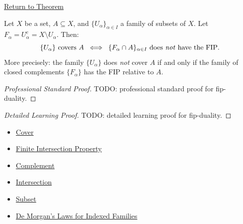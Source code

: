 \newpage
{}
\label{prf:fip-duality}

\begin{remark*}[Return]
\hyperref[prop:fip-duality]{Return to Theorem}
\end{remark*}

\begin{proposition*}
Let $X$ be a set, $A \subseteq X$, and $\{U_\alpha\}_{\alpha \in I}$ a
family of subsets of $X$. Let $F_\alpha = U_\alpha^c = X \setminus U_\alpha$.
Then:
\[
\{U_\alpha\} \text{ covers } A
\;\;\Longleftrightarrow\;\;
\{F_\alpha \cap A\}_{\alpha \in I} \text{ does \emph{not} have the FIP}.
\]
More precisely: the family $\{U_\alpha\}$ does \emph{not} cover $A$ if and
only if the family of closed complements $\{F_\alpha\}$ has the FIP relative
to $A$.
\end{proposition*}

\begin{proof}[Professional Standard Proof]
\LRAProofBodyStart
TODO: professional standard proof for fip-duality.
\end{proof}

\begin{proof}[Detailed Learning Proof]
\LRAProofBodyStart
TODO: detailed learning proof for fip-duality.
\end{proof}

\begin{remark*}
\end{remark*}

\begin{dependencies}
\begin{itemize}
  \item \hyperref[def:cover-full]{Cover}
  \item \hyperref[def:fip]{Finite Intersection Property}
  \item \hyperref[def:complement]{Complement}
  \item \hyperref[def:intersection]{Intersection}
  \item \hyperref[def:subset]{Subset}
  \item \hyperref[thm:indexed-de-morgan]{De Morgan's Laws for Indexed Families}
\end{itemize}
\end{dependencies}

\clearpage
